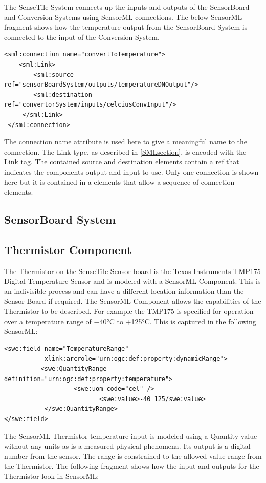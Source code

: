 \documentclass[]{final_report}
\begin{document}
The SenseTile System connects up the inputs and outputs of the SensorBoard and Conversion Systems using SensorML connections. The below SensorML fragment shows how the temperature output from the SensorBoard System is connected to the input of the Conversion System.

\begin{lstlisting}
<sml:connection name="convertToTemperature">
    <sml:Link>
        <sml:source ref="sensorBoardSystem/outputs/temperatureDNOutput"/>
        <sml:destination ref="convertorSystem/inputs/celciusConvInput"/>
     </sml:Link>
 </sml:connection>
\end{lstlisting}

The connection name attribute is used here to give a meaningful name to the connection. The Link type, as described in \ref{SMLsection}, is encoded with the Link tag. The contained source and destination elements contain a ref that indicates the components output and input to use. Only one connection is shown here but it is contained in a elements that allow a sequence of connection elements. 
  
\subsection{SensorBoard System}


\subsection{Thermistor Component}
The Thermistor on the SenseTile Sensor board is the Texas Instruments TMP175 Digital Temperature Sensor and is modeled with a SensorML Component. This is an indivisible process and can have a different location information than the Sensor Board if required. The SensorML Component allows the capabilities of the Thermistor to be described. For example the TMP175 is  specified for operation over a temperature range of −40°C to +125°C. This is captured in the following SensorML:

\begin{lstlisting}
<swe:field name="TemperatureRange" 
           xlink:arcrole="urn:ogc:def:property:dynamicRange">
          <swe:QuantityRange definition="urn:ogc:def:property:temperature">
                   <swe:uom code="cel" /> 
                          <swe:value>-40 125/swe:value> 
           </swe:QuantityRange>
</swe:field>
\end{lstlisting}

The SensorML Thermistor temperature input is modeled using a Quantity value without any units as is a measured physical phenomena. Its output is a digital number from the sensor. The range is constrained to the allowed value range from the Thermistor. The following fragment shows how the input and outputs for the Thermistor look in SensorML:
\end{document}
